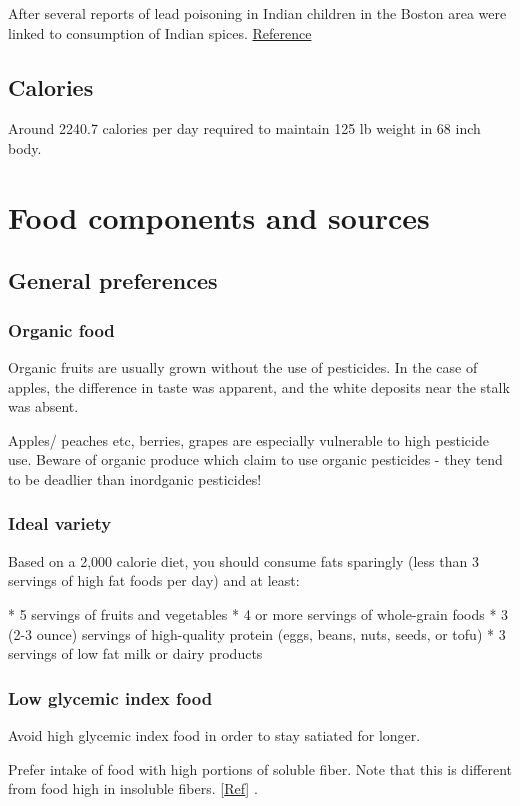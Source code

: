 \documentclass[oneside, article]{memoir}
\begin{document}
After several reports of lead poisoning in Indian children in the Boston area were linked to consumption of Indian spices. \href {http://www.time.com/time/health/article/0,8599,1971906,00.html}{Reference}

\section{Calories}
Around 2240.7 calories per day required to maintain 125 lb weight in 68 inch body.

\chapter{Food components and sources}
\section{General preferences}
\subsection{Organic food}
Organic fruits are usually grown without the use of pesticides. In the case of apples, the difference in taste was apparent, and the white deposits near the stalk was absent.

Apples/ peaches etc, berries, grapes are especially vulnerable to high pesticide use. Beware of organic produce which claim to use organic pesticides - they tend to be deadlier than inordganic pesticides!

\subsection{Ideal variety}
Based on a 2,000 calorie diet, you should consume fats sparingly (less than 3 servings of high fat foods per day) and at least:
    
    * 5 servings of fruits and vegetables
    * 4 or more servings of whole-grain foods
    * 3 (2-3 ounce) servings of high-quality protein (eggs, beans, nuts, seeds, or tofu)
    * 3 servings of low fat milk or dairy products

\subsection{Low glycemic index food}
Avoid high  glycemic index food in order to stay satiated for longer. 

Prefer intake of food with high portions of soluble fiber. Note that this is different from food high in insoluble fibers.  [\href{http://www.medicinenet.com/script/main/art.asp?articlekey=56527&page=2}{Ref}] .
\end{document}
